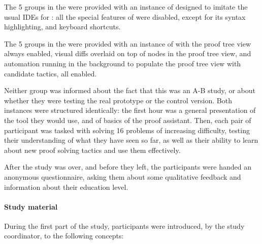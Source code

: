 The 5 groups in the  were provided with an instance of
\PeaCoq{} designed to imitate the usual IDEs for \Coq{}: all the special
features of \PeaCoq{} were disabled, except for its syntax highlighting, and
keyboard shortcuts.

The 5 groups in the  were provided with an instance of
\PeaCoq{} with the proof tree view always enabled, visual diffs overlaid on top
of nodes in the proof tree view, and automation running in the background to
populate the proof tree view with candidate tactics, all enabled.

Neither group was informed about the fact that this was an A-B study, or about
whether they were testing the real prototype or the control version.  Both
instances were structured identically: the first hour was a general presentation
of the tool they would use, and of basics of the \Coq{} proof assistant.  Then,
each pair of participant was tasked with solving 16 problems of increasing
difficulty, testing their understanding of what they have seen so far, as well
as their ability to learn about new proof solving tactics and use them
effectively.

After the study was over, and before they left, the participants were handed an
anonymous questionnaire, asking them about some qualitative feedback and
information about their education level.

\paragraph{Study material}

During the first part of the study, participants were introduced, by the study
coordinator, to the following concepts:

